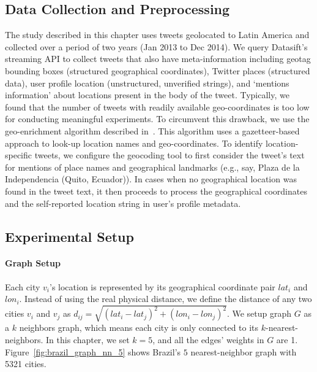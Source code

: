 \subsection{Data Collection and Preprocessing}
\label{sec:data_collection}
The study described in this chapter uses tweets geolocated to Latin America and
collected over a period of two years
(Jan 2013 to Dec 2014).
We query Datasift's streaming API to collect tweets that also have meta-information including geotag bounding boxes (structured geographical coordinates), Twitter places (structured data), user profile location (unstructured, unverified strings), and `mentions information' about locations present in the body of the tweet.
Typically, we found that
the number of tweets with readily available geo-coordinates is too low for conducting meaningful experiments.
To circumvent this drawback, we use the geo-enrichment algorithm described in~\cite{ramakrishnan2014beating}.
This algorithm uses a gazetteer-based approach to look-up location names and geo-coordinates.
To identify location-specific tweets, we configure the geocoding tool to first consider the tweet's text for mentions of place names and geographical landmarks (e.g., say, Plaza de la Independencia (Quito, Ecuador)).
In cases when no geographical location was found in the tweet text, it then proceeds to process the geographical coordinates and the self-reported location string in user's profile metadata.





\subsection{Experimental Setup}
\label{sec:experimental_setup}

\paragraph{Graph Setup}
Each city $v_i$'s location is represented by its geographical coordinate pair $lat_i$ and $lon_i$. Instead of using the real physical distance, we define the distance of any two cities $v_i$ and $v_j$ as $d_{ij}=\sqrt{(lat_i-lat_j)^2+(lon_i-lon_j)^2}$. We setup graph $G$ as a $k$ neighbors graph, which means  each city is only  connected to its $k$-nearest-neighbors. In this chapter, we set $k=5$, and all the edges' weights  in $G$ are 1. Figure~\ref{fig:brazil_graph_nn_5} shows Brazil's $5$ nearest-neighbor graph with 5321 cities.

